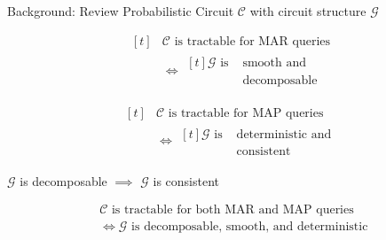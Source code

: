 \documentclass[aspectratio=169]{beamer}
\begin{document}
  \begin{frame}{Background: Review}
    \onslide<+->
    Probabilistic Circuit $\mathscr{C}$ with circuit structure $\mathscr{G}$
    \onslide<+->
    \begin{minipage}[c]{0.49\textwidth}
      \[
        \begin{aligned}[t]
          &\text{$\mathscr{C}$ is tractable for MAR queries} \\
          &\iff
            \begin{aligned}[t]
              \text{$\mathscr{G}$ is } &\text{smooth and} \\
              &\text{decomposable}
            \end{aligned}
        \end{aligned}
      \]
    \end{minipage}
    \hfill
    \begin{minipage}[c]{0.49\textwidth}
      \[
        \begin{aligned}[t]
          &\text{$\mathscr{C}$ is tractable for MAP queries} \\
          &\iff
          \begin{aligned}[t]
            \text{$\mathscr{G}$ is } &\text{deterministic and} \\
            &\text{consistent}
          \end{aligned}
        \end{aligned}
      \]
    \end{minipage}

    \bigskip
    \onslide<+->
    $\mathscr{G}$ is decomposable $\implies$ $\mathscr{G}$ is consistent
    \bigskip

    \onslide<+->
    \begin{mybox}
      \begin{align*}
        &\text{$\mathscr{C}$ is tractable for both MAR and MAP queries} \\
        &\iff \text{$\mathscr{G}$ is decomposable, smooth, and deterministic }
      \end{align*}
    \end{mybox}
  \end{frame}
\end{document}
